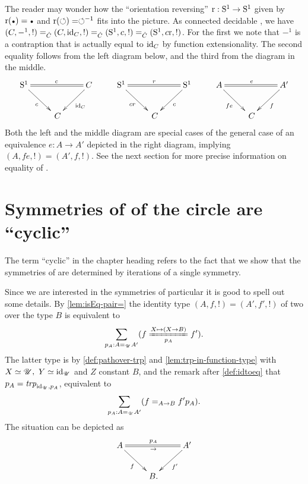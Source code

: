 \begin{remark}
  \label{rem:flipthecircle}
The reader may wonder how the ``orientation reversing'' $\mathrm{r}:{\mathrm{S}^1}\to {\mathrm{S}^1}$ given
by $\revers(\base)=\base$ and $\mathrm{r}(\circlearrowleft)=\circlearrowleft^{-1}$ fits into the picture.
As connected decidable \coverings, we have
$(C,-^1,!) =_{\hat C} (C,\mathord{\mathrm{id}}_C,!) =_{\hat C} ({\mathrm{S}^1},c,!) =_{\hat C} ({\mathrm{S}^1},c\mathrm{r},!)$.
For the first we note that $-^1$ is a contraption that is actually equal to 
$\mathord{\mathrm{id}}_C$ by function extensionality. The second equality follows from the left
diagram below, and the third from the diagram in the middle.
\[
\xymatrix{
\Sc\ar@{=}[rr]^{\etop{c}}\ar[dr]_{c}&&C\ar[dl]^{\id_C} &
\Sc\ar@{=}[rr]^{\etop{r}}\ar[dr]_{cr}&&\Sc\ar[dl]^{c} &
A\ar@{=}[rr]^{\etop{e}}\ar[dr]_{fe}&&A'\ar[dl]^{f}
\\
&\,C&&&\,C&&&\,C&}
\]
Both the left and the middle diagram are special cases of the general case of an equivalence
$e: A\to A'$ depicted in the right diagram, implying $(A,fe,!)=(A',f,!)$.
See the next section for more precise information on equality of \coverings.
\end{remark}


\section{Symmetries of \coverings of the circle are ``cyclic'' }
\label{sec:deckS1}

The term ``cyclic'' in the chapter heading refers to the fact that we show 
that the symmetries of \coverings are determined by iterations of a single symmetry.  

\begin{remark}
Since we are interested in the symmetries of particular \coverings it is 
good to spell out some details.
By \cref{lem:isEq-pair=} the identity type $(A,f,!)=(A',f',!)$ of 
two \coverings over the type $B$ is equivalent to
\[
\sum_{p_A:A=_{\UU}A'}(\pathover{f}{X\mapsto(X\to B)}{p_A}{f'}).
\]
The latter type is by \cref{def:pathover-trp} and \cref{lem:trp-in-function-type}
with $X\jdeq\UU,~Y\jdeq\id_{\UU}$ and $Z$ constant $B$, and the remark
after \cref{def:idtoeq} that $\ptoe{p}_A = \trp[\id_{\UU}]{p_A}$, equivalent to
\[
\sum_{p_A:A=_{{\mathscr{U}}}A'}(f =_{A\to B}f'{p}_A). 
\]
The situation can be depicted as
$$\xymatrix{A\ar@{=}[rr]^{p_A}_\to\ar[dr]_f&&A'\ar[dl]^{f'}\\&\,B.&}$$
\end{remark}


